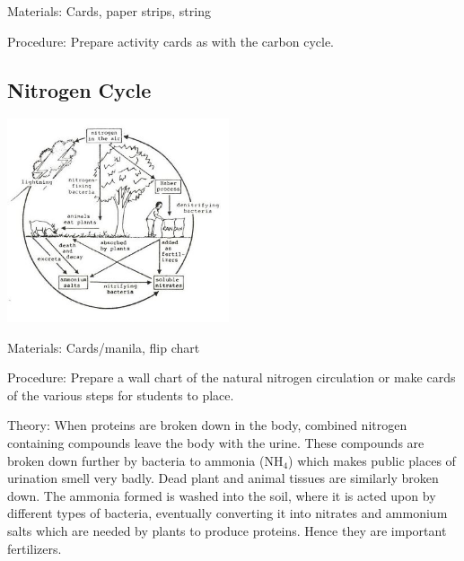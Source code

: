 \begin{multicols}{2}
\begin{description*}
\item[Materials:]{Cards, paper strips, string}
\item[Procedure:]{Prepare activity cards as with the carbon cycle.}
\end{description*}

\subsection{Nitrogen Cycle}

\begin{center}
\includegraphics[width=0.49\textwidth]{./img/source/nitrogen-cycle.jpg}
\end{center}

\begin{description*}
\item[Materials:]{Cards/manila, flip chart}
\item[Procedure:]{Prepare a wall chart of the natural nitrogen
circulation or make cards of the various steps for students to place. }
\item[Theory:]{When proteins are broken down in
the body, combined nitrogen containing
compounds leave the body with the urine. These
compounds are broken down further by bacteria
to ammonia (NH$_4$) which makes
public places of urination smell very badly.
Dead plant and animal tissues are similarly
broken down. The ammonia formed is washed
into the soil, where it is acted upon by different
types of bacteria, eventually converting it into
nitrates and ammonium salts which are needed
by plants to produce proteins. Hence they are
important fertilizers.}
\end{description*}


\end{multicols}
